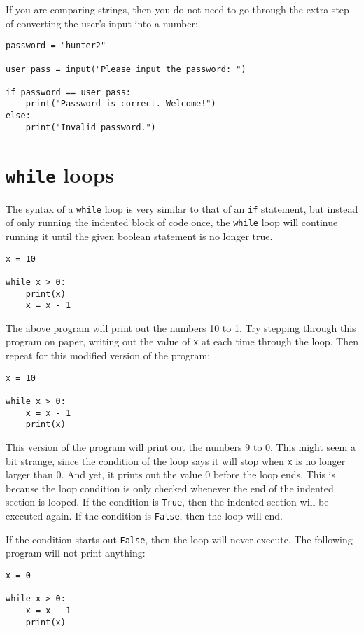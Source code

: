 \documentclass[12pt,hidelinks]{article}
\begin{document}
If you are comparing strings, then you do not need to go through the extra step of converting the user's input into a number:

\begin{lstlisting}[style=python]
password = "hunter2"

user_pass = input("Please input the password: ")

if password == user_pass:
    print("Password is correct. Welcome!")
else:
    print("Invalid password.")
\end{lstlisting}


\section{\texttt{while} loops}
The syntax of a \texttt{while} loop is very similar to that of an \texttt{if} statement, but instead of only running the indented block of code once, the \texttt{while} loop will continue running it until the given boolean statement is no longer true.

\begin{lstlisting}[style=python]
x = 10

while x > 0:
    print(x)
    x = x - 1
\end{lstlisting}

The above program will print out the numbers 10 to 1. Try stepping through this program on paper, writing out the value of \texttt{x} at each time through the loop. Then repeat for this modified version of the program:

\begin{lstlisting}[style=python]
x = 10

while x > 0:
    x = x - 1
    print(x)
\end{lstlisting}

This version of the program will print out the numbers 9 to 0. This might seem a bit strange, since the condition of the loop says it will stop when \texttt{x} is no longer larger than 0. And yet, it prints out the value 0 before the loop ends. This is because the loop condition is only checked whenever the end of the indented section is looped. If the condition is \texttt{True}, then the indented section will be executed again. If the condition is \texttt{False}, then the loop will end.

If the condition starts out \texttt{False}, then the loop will never execute. The following program will not print anything:

\begin{lstlisting}[style=python]
x = 0

while x > 0:
    x = x - 1
    print(x)
\end{lstlisting}
\end{document}

